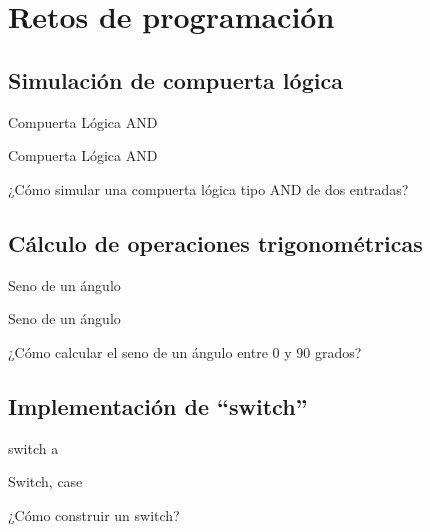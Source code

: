 \documentclass[xcolor=dvipsnames,handout]{beamer}
\begin{document}
\section[Retos]{Retos de programaci\'on}

\subsection[L\'ogica]{Simulación de compuerta l\'ogica}

\begin{frame}{Compuerta Lógica AND}%
\begin{block}{Compuerta Lógica AND}
\begin{center}
¿Cómo simular una compuerta lógica tipo AND de dos entradas?
\end{center} 
\end{block}
\end{frame}



\subsection[Trigonometr\'\i a]{C\'alculo de operaciones trigonom\'etricas}

\begin{frame}{Seno de un ángulo}%
\begin{block}{Seno de un ángulo}

\begin{center}
¿Cómo calcular el seno de un ángulo entre 0 y 90 grados?
\end{center} 
\end{block}
\end{frame}

\subsection[Switch]{Implementaci\'on de ``switch''}

\begin{frame}{switch a}
\begin{block}{Switch, case}

\begin{center}
¿Cómo construir un switch?
\end{center} 
\end{block}
\end{frame}
\end{document}
